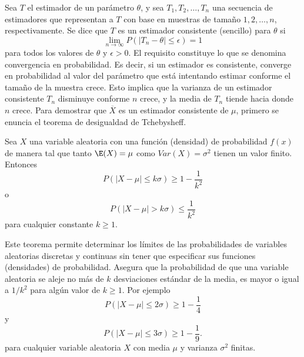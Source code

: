 \begin{def.}
    Sea $T$ el estimador de un parámetro $\theta$, y sea $T_1,T_2,\ldots,T_n$ una secuencia de estimadores que representan a $T$ con base en muestras de tamaño $1,2,\ldots, n$, respectivamente. Se dice que $T$ es un estimador consistente (sencillo) para $\theta$ si
    $$\lim_{n\to \infty}P(|T_n-\theta|\leq \epsilon)=1$$
    para todos los valores de $\theta$ y $\epsilon>0$.
    El requisito constituye lo que se denomina convergencia en probabilidad. Es decir, si un estimador es consistente, converge en probabilidad al valor del parámetro que está intentando estimar conforme el tamaño de la muestra crece. Esto implica que la varianza de un estimador consistente $T_n$ disminuye conforme $n$ crece, y la media de $T_n$ tiende hacia donde $n$ crece. Para demostrar que $\overline{X}$ es un estimador consistente de $\mu$, primero se enuncia el teorema de desigualdad de Tchebysheff.
\end{def.}

\begin{teo}
    Sea $X$ una variable aleatoria con una función (densidad) de probabilidad $f(x)$ de manera tal que tanto $\E(X)=\mu$ como $Var(X)=\sigma^2$ tienen un valor finito. Entonces
    $$P(|X-\mu|\leq k\sigma)\geq 1-\dfrac{1}{k^2}$$
    o
    $$P(|X-\mu|>k\sigma)\leq \dfrac{1}{k^2}$$
    para cualquier constante $k\geq 1$.
\end{teo}

Este teorema permite determinar los límites de las probabilidades de variables aleatorias discretas y continuas sin tener que especificar sus funciones (densidades) de probabilidad. Asegura que la probabilidad de que una variable aleatoria se aleje no más de $k$ desviaciones estándar de la media, es mayor o igual a $1/k^2$ para algún valor de $k\geq 1$. Por ejemplo
$$P(|X-\mu|\leq 2\sigma)\geq 1-\dfrac{1}{4}$$
y
$$P(|X-\mu|\leq 3\sigma)\geq 1-\dfrac{1}{9}.$$
para cualquier variable aleatoria $X$ con media $\mu$ y varianza $\sigma^2$ finitas.

